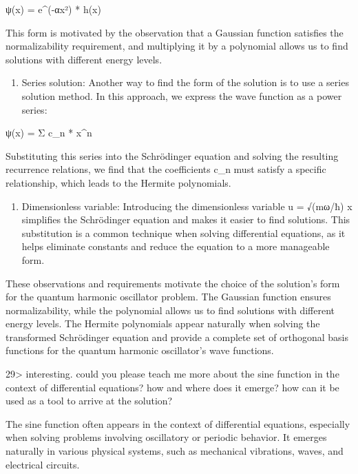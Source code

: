 \documentclass[
]{article}
\providecommand{\tightlist}{%
  \setlength{\itemsep}{0pt}\setlength{\parskip}{0pt}}
\begin{document}
ψ(x) = e\^{}(-αx²) * h(x)

This form is motivated by the observation that a Gaussian function
satisfies the normalizability requirement, and multiplying it by a
polynomial allows us to find solutions with different energy levels.

\begin{enumerate}
\def\labelenumi{\arabic{enumi}.}
\setcounter{enumi}{2}
\tightlist
\item
  Series solution: Another way to find the form of the solution is to
  use a series solution method. In this approach, we express the wave
  function as a power series:
\end{enumerate}

ψ(x) = Σ c\_n * x\^{}n

Substituting this series into the Schrödinger equation and solving the
resulting recurrence relations, we find that the coefficients c\_n must
satisfy a specific relationship, which leads to the Hermite polynomials.

\begin{enumerate}
\def\labelenumi{\arabic{enumi}.}
\setcounter{enumi}{3}
\tightlist
\item
  Dimensionless variable: Introducing the dimensionless variable u =
  √(mω/ħ) x simplifies the Schrödinger equation and makes it easier to
  find solutions. This substitution is a common technique when solving
  differential equations, as it helps eliminate constants and reduce the
  equation to a more manageable form.
\end{enumerate}

These observations and requirements motivate the choice of the
solution's form for the quantum harmonic oscillator problem. The
Gaussian function ensures normalizability, while the polynomial allows
us to find solutions with different energy levels. The Hermite
polynomials appear naturally when solving the transformed Schrödinger
equation and provide a complete set of orthogonal basis functions for
the quantum harmonic oscillator's wave functions.

29\textgreater{} interesting. could you please teach me more about the
sine function in the context of differential equations? how and where
does it emerge? how can it be used as a tool to arrive at the solution?

The sine function often appears in the context of differential
equations, especially when solving problems involving oscillatory or
periodic behavior. It emerges naturally in various physical systems,
such as mechanical vibrations, waves, and electrical circuits.
\end{document}
